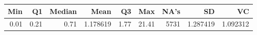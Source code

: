 
\begin{tabular}[t]{rrrrrrrrr}
\toprule
Min & Q1 & Median & Mean & Q3 & Max & NA's & SD & VC\\
\midrule
0.01 & 0.21 & 0.71 & 1.178619 & 1.77 & 21.41 & 5731 & 1.287419 & 1.092312\\
\bottomrule
\end{tabular}